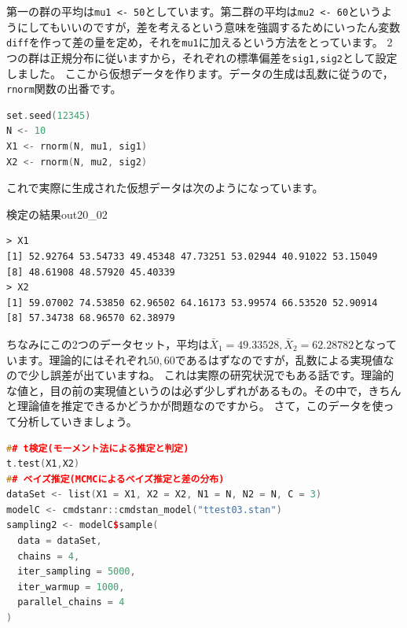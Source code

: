 \documentclass{ltjsbook}
\begin{document}
第一の群の平均は\verb|mu1 <- 50|としています。第二群の平均は\verb|mu2 <- 60|というようにしてもいいのですが，差を考えるという意味を強調するためにいったん変数\verb|diff|を作って差の量を定め，それを\verb|mu1|に加えるという方法をとっています。
2つの群は正規分布に従いますから，それぞれの標準偏差を\verb|sig1,sig2|として設定しました。
ここから仮想データを作ります。データの生成は乱数に従うので，\verb|rnorm|関数の出番です。
\begin{lstlisting}[language=c++,label={code:20_03},caption={仮想データの生成}]
set.seed(12345)
N <- 10
X1 <- rnorm(N, mu1, sig1)
X2 <- rnorm(N, mu2, sig2)
\end{lstlisting}
これで実際に生成された仮想データは次のようになっています。
\begin{Rscreen}{検定の結果}{out20_02}
	\begin{verbatim}
> X1
[1] 52.92764 53.54733 49.45348 47.73251 53.02944 40.91022 53.15049 
[8] 48.61908 48.57920 45.40339
> X2
[1] 59.07002 74.53850 62.96502 64.16173 53.99574 66.53520 52.90914 
[8] 57.34738 68.96570 62.38979
\end{verbatim}
\end{Rscreen}
ちなみにこの2つのデータセット，平均は$\bar{X}_1=49.33528,\bar{X}_2=62.28782$となっています。理論的にはそれぞれ$50,60$であるはずなのですが，乱数による実現値なので少し誤差が出ていますね。
これは実際の研究状況でもある話です。理論的な値と，目の前の実現値というのは必ず少しずれがあるもの。その中で，きちんと理論値を推定できるかどうかが問題なのですから。
さて，このデータを使って分析していきましょう。
\begin{lstlisting}[language=c++,label={code:20_04},caption={パラメータリカバリ・検証}]
## t検定(モーメント法による推定と判定)
t.test(X1,X2)
## ベイズ推定(MCMCによるベイズ推定と差の分布)
dataSet <- list(X1 = X1, X2 = X2, N1 = N, N2 = N, C = 3)
modelC <- cmdstanr::cmdstan_model("ttest03.stan")
sampling2 <- modelC$sample(
  data = dataSet,
  chains = 4,
  iter_sampling = 5000,
  iter_warmup = 1000,
  parallel_chains = 4
)
\end{lstlisting}
\end{document}
